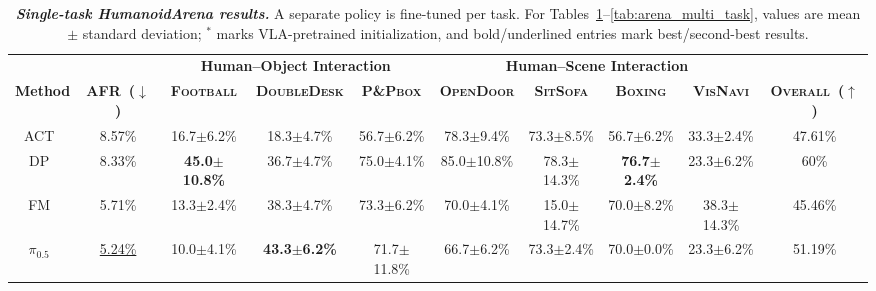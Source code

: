 


  




\begin{table}[H]
  \setlength{\belowcaptionskip}{6pt}
  \caption{\textbf{\textit{Single-task HumanoidArena results.}} A separate policy is fine-tuned per task. For Tables~\ref{tab:arena_single_task}--\ref{tab:arena_multi_task}, values are mean $\pm$ standard deviation; $^{*}$ marks VLA-pretrained initialization, and bold/underlined entries mark best/second-best results.}
  \label{tab:arena_single_task}
  \centering
  \begin{adjustbox}{max width=\textwidth}
  \setlength{\tabcolsep}{4.2pt}
  \renewcommand{\arraystretch}{1.08}

  \begin{tabular}{ccccc|ccccc}
  \toprule
  & &
  \multicolumn{3}{c|}{\textbf{Human--Object Interaction}} &
  \multicolumn{4}{c}{\textbf{Human--Scene Interaction}} & \\
  \cmidrule(lr){3-5}
  \cmidrule(lr){6-9}

  \multirow{-2}{*}{\textbf{Method}} &
  \multirow{-2}{*}{\textbf{AFR~($\downarrow$)}} &
  \textbf{\textsc{Football}} &
  \textbf{\textsc{DoubleDesk}} &
  \textbf{\textsc{P\&Pbox}} &
  \textbf{\textsc{OpenDoor}} &
  \textbf{\textsc{SitSofa}} &
  \textbf{\textsc{Boxing}} &
  \textbf{\textsc{VisNavi}} &
  \multirow{-2}{*}{\textbf{\textsc{Overall~($\uparrow$)}}} \\
  
  \midrule
  ACT~\cite{ACT}
  & 8.57\%
  & 16.7$\pm$6.2\%
  & 18.3$\pm$4.7\%
  & 56.7$\pm$6.2\%
  & 78.3$\pm$9.4\%
  & 73.3$\pm$8.5\%
  & 56.7$\pm$6.2\%
  & 33.3$\pm$2.4\%
  & 47.61\% \\

  DP~\cite{chi2023diffusionpolicy}
  & 8.33\%
  & \textbf{45.0$\pm$10.8\%}
  & 36.7$\pm$4.7\%
  & 75.0$\pm$4.1\%
  & 85.0$\pm$10.8\%
  & 78.3$\pm$14.3\%
  & \textbf{76.7$\pm$2.4\%}
  & 23.3$\pm$6.2\%
  & 60\% \\

  FM~\cite{FM_objective}
  & 5.71\%
  & 13.3$\pm$2.4\%
  & 38.3$\pm$4.7\%
  & 73.3$\pm$6.2\%
  & 70.0$\pm$4.1\%
  & 15.0$\pm$14.7\%
  & 70.0$\pm$8.2\%
  & 38.3$\pm$14.3\%
  & 45.46\% \\

  $\pi_{0.5}$~\cite{pi05}
  & \underline{5.24\%}
  & 10.0$\pm$4.1\%
  & \textbf{43.3$\pm$6.2\%}
  & 71.7$\pm$11.8\%
  & 66.7$\pm$6.2\%
  & 73.3$\pm$2.4\%
  & 70.0$\pm$0.0\%
  & 23.3$\pm$6.2\%
  & 51.19\% \\


\end{tabular}
\end{adjustbox}
\end{table}

